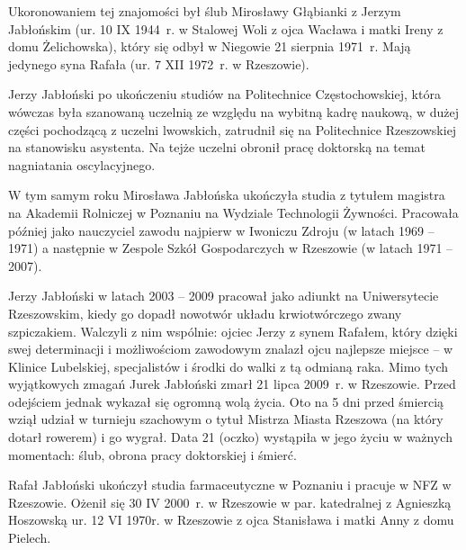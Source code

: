 Ukoronowaniem tej znajomości był ślub Mirosławy Głąbianki z Jerzym Jabłońskim (ur. 10 IX 1944~r. w Stalowej Woli z ojca Wacława i matki Ireny z domu Żelichowska), który się odbył w Niegowie 21 sierpnia 1971~r. Mają jedynego syna Rafała (ur. 7 XII 1972~r. w Rzeszowie).

Jerzy Jabłoński po ukończeniu studiów na Politechnice Częstochowskiej, która wówczas była szanowaną uczelnią ze względu na wybitną kadrę naukową, w dużej części pochodzącą z uczelni lwowskich, zatrudnił się na Politechnice Rzeszowskiej na stanowisku asystenta. Na tejże uczelni obronił pracę doktorską na temat nagniatania oscylacyjnego. 

W tym samym roku Mirosława Jabłońska ukończyła studia z tytułem magistra na Akademii Rolniczej w Poznaniu na Wydziale Technologii Żywności. Pracowała później jako nauczyciel zawodu najpierw w Iwoniczu Zdroju (w latach 1969 – 1971) a następnie w Zespole Szkół Gospodarczych w Rzeszowie (w latach 1971 – 2007). 

Jerzy Jabłoński w latach 2003 -- 2009 pracował jako adiunkt na Uniwersytecie Rzeszowskim, kiedy go dopadł nowotwór układu krwiotwórczego zwany szpiczakiem. Walczyli z nim wspólnie: ojciec Jerzy z synem Rafałem, który dzięki swej determinacji i możliwościom zawodowym znalazł ojcu najlepsze miejsce -- w Klinice Lubelskiej, specjalistów i środki do walki z tą odmianą raka. Mimo tych wyjątkowych zmagań Jurek Jabłoński zmarł 21 lipca 2009~r. w Rzeszowie. Przed odejściem jednak wykazał się ogromną wolą życia.
Oto na 5 dni przed śmiercią wziął udział w turnieju szachowym o tytuł Mistrza Miasta Rzeszowa (na który dotarł rowerem) i go wygrał. Data 21 (oczko) wystąpiła w jego życiu w ważnych momentach: ślub, obrona pracy doktorskiej i śmierć.

Rafał Jabłoński ukończył studia farmaceutyczne w Poznaniu i pracuje w NFZ w Rzeszowie. Ożenił się 30 IV 2000~r. w Rzeszowie w par. katedralnej z Agnieszką Hoszowską ur. 12 VI 1970r. w Rzeszowie z ojca Stanisława i matki Anny z domu Pielech.

